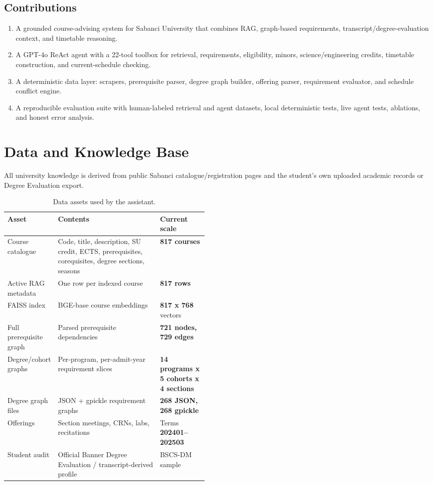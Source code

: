\documentclass[10pt,letterpaper]{article}
\begin{document}
\subsection{Contributions}
\begin{enumerate}
  \item A grounded course-advising system for Sabanci University that combines RAG, graph-based requirements, transcript/degree-evaluation context, and timetable reasoning.
  \item A GPT-4o ReAct agent with a 22-tool toolbox for retrieval, requirements, eligibility, minors, science/engineering credits, timetable construction, and current-schedule checking.
  \item A deterministic data layer: scrapers, prerequisite parser, degree graph builder, offering parser, requirement evaluator, and schedule conflict engine.
  \item A reproducible evaluation suite with human-labeled retrieval and agent datasets, local deterministic tests, live agent tests, ablations, and honest error analysis.
\end{enumerate}

\section{Data and Knowledge Base}

All university knowledge is derived from public Sabanci catalogue/registration pages and the student's own uploaded academic records or Degree Evaluation export.

\begin{table}[h]
\centering
\small
\begin{tabularx}{\linewidth}{@{}p{0.23\linewidth}Yp{0.24\linewidth}@{}}
\toprule
\textbf{Asset} & \textbf{Contents} & \textbf{Current scale} \\
\midrule
Course catalogue & Code, title, description, SU credit, ECTS, prerequisites, corequisites, degree sections, seasons & \textbf{817 courses} \\
Active RAG metadata & One row per indexed course & \textbf{817 rows} \\
FAISS index & BGE-base course embeddings & \textbf{817 x 768} vectors \\
Full prerequisite graph & Parsed prerequisite dependencies & \textbf{721 nodes, 729 edges} \\
Degree/cohort graphs & Per-program, per-admit-year requirement slices & \textbf{14 programs x 5 cohorts x 4 sections} \\
Degree graph files & JSON + gpickle requirement graphs & \textbf{268 JSON, 268 gpickle} \\
Offerings & Section meetings, CRNs, labs, recitations & Terms \textbf{202401--202503} \\
Student audit & Official Banner Degree Evaluation / transcript-derived profile & BSCS-DM sample \\
\bottomrule
\end{tabularx}
\caption{Data assets used by the assistant.}
\end{table}
\end{document}
